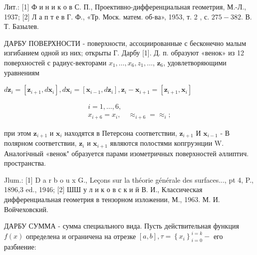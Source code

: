 \documentclass[10pt]{article}
\begin{document}
Лит.: [1] Ф и н и к о в С. П., Проективно-дифференциальная геометрия, М.-Л., 1937; [2] Л а п т е в Г. Ф., «Тр. Моск. матем. об-ва», 1953, т. 2 , с. $275-382$. В. Т. Базылев.



ДАРБУ ПОВЕРХНОСТИ - поверхности, ассоциированные с бесконечно малым изгибанием одной из них; открыты Г. Дарбу [1]. Д. п. образуют «венок» из 12 поверхностей с радиус-векторами $x_{1}, \ldots, x_{6}, z_{1}, \ldots$, $\boldsymbol{z}_{6}$, удовлетворяющими уравнениям



$d \boldsymbol{z}_{i}=\left[\boldsymbol{z}_{i+1}, d \boldsymbol{x}_{i}\right], d \boldsymbol{x}_{i}=\left[\boldsymbol{x}_{i-1}, d \boldsymbol{z}_{i}\right], \boldsymbol{z}_{i}-\boldsymbol{x}_{i+1}=\left[\boldsymbol{z}_{i+1}, \boldsymbol{x}_{i}\right]$



\[

\begin{gathered}

i=1, \ldots, 6, \\

x_{i+6}=x_{i}, \quad \approx_{i+6}=\approx_{i} ;

\end{gathered}

\]



при этом $\boldsymbol{z}_{i+1}$ и $\boldsymbol{x}_{i}$ находятся в Петерсона соответствии, $\boldsymbol{z}_{i+1}$ И $\boldsymbol{x}_{i-1}$ - В полярном соответствии, $\boldsymbol{z}_{i}$ и $\boldsymbol{x}_{i+1}$ являются полостями копгруэнции $\mathrm{W}$. Аналогічный «венок" образуется парами изометричных поверхностей әллиптич. пространства.



Jlum.: [1] D a r b o u x G., Leçons sur la théorie générale des surfaces..., pt 4, P., 1896,3 ed., 1946; [2] ШШ у л и к о в с к и й В. И., Классическая дифференциальная геометрия в тензорном изложении, М., 1963. М. И. Войчеховский.



ДАРБУ СУММА - сумма специального вида. Пусть действительная функция $f(x)$ определена и ограничена на отрезке $[a, b], \tau=\left\{x_{i}\right\}_{i=0}^{i=k}-$ его разбиение:
\end{document}
